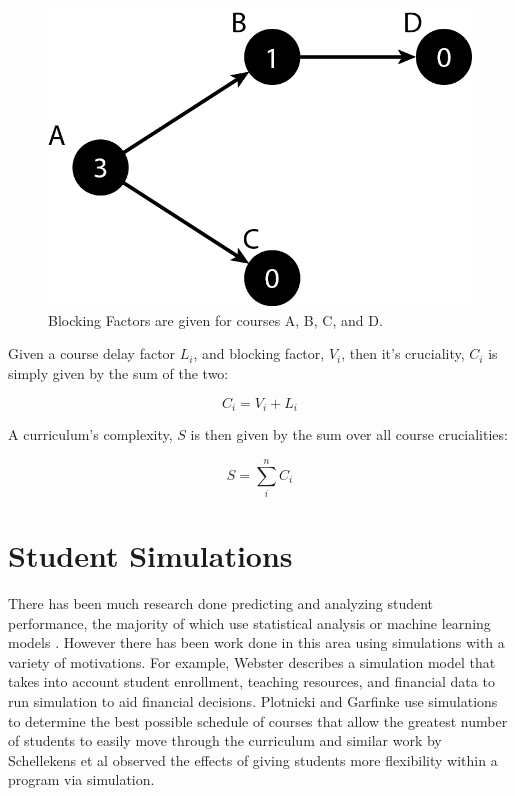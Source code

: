 \documentclass[botnum, fleqn]{unmeethesis}
\begin{document}
    \begin{figure}[h!]
      \centerline{\includegraphics[scale=0.4]{./figures/blocking_factor.png}}
      \caption{Blocking Factors are given for courses A, B, C, and D.} 
      \label{fig:blocking_factor_example}
    \end{figure}

    Given a course delay factor \(L_i\), and blocking factor, \(V_i\), then it's cruciality, \(C_i\) is simply given by the sum of the two:

    \begin{equation}
      C_{i} = V_{i} + L_{i}
    \end{equation}

    A curriculum's complexity, \(S\) is then given by the sum over all course crucialities:

    \begin{equation}
      S = \sum_{i}^n C_{i}
    \end{equation}


  \section{Student Simulations}
    There has been much research done predicting and analyzing student performance, the majority of which use statistical analysis or machine learning models \cite{7008697,6826206,goenner2004predicting}. However there has been work done in this area using simulations with a variety of motivations. For example, Webster \cite{10.2307/3444955} describes a simulation model that takes into account student enrollment, teaching resources, and financial data to run simulation to aid financial decisions. Plotnicki and Garfinke \cite{RePEc:eee:soceps:v:20:y:1986:i:4:p:193-199} use simulations to determine the best possible schedule of courses that allow the greatest number of students to easily move through the curriculum and similar work by Schellekens et al \cite{10.2307/40540244} observed the effects of giving students more flexibility within a program via simulation.
\end{document}
